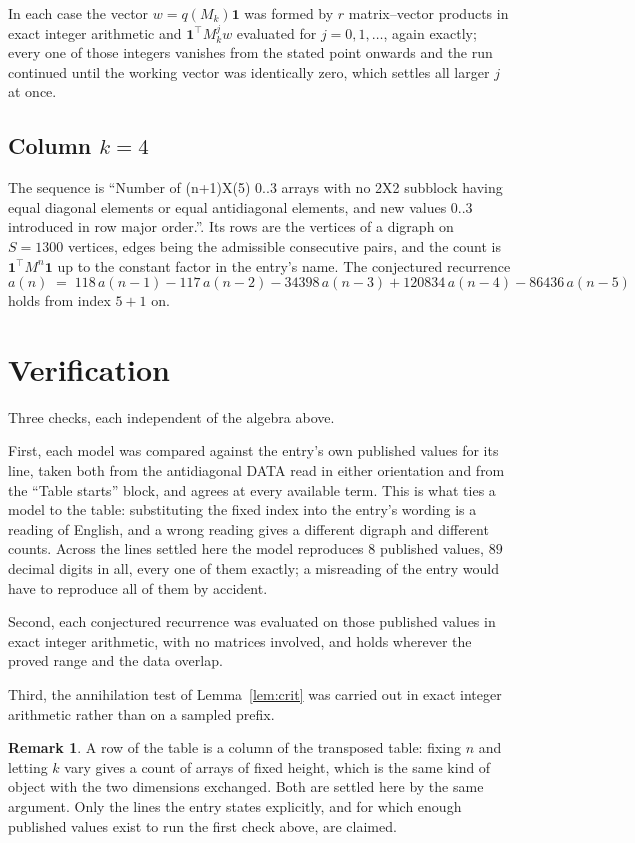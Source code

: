 \documentclass[11pt,a4paper]{article}
\theoremstyle{plain}
\theoremstyle{definition}
\newtheorem{remark}[theorem]{Remark}
\begin{document}
In each case the vector $w=q(M_k)\mathbf{1}$ was formed by $r$ matrix--vector products in
exact integer arithmetic and $\mathbf{1}^{\!\top}M_k^{j}w$ evaluated for $j=0,1,\dots$,
again exactly; every one of those integers vanishes from the stated point onwards and the run
continued until the working vector was identically zero, which settles all larger $j$ at once.

\subsection*{Column $k$$=4$}
The sequence is ``Number of (n+1)X(5) 0..3 arrays with no 2X2 subblock having equal diagonal elements or equal antidiagonal elements, and new values 0..3 introduced in row major order.''. Its rows are the vertices of a digraph on
$S=1300$ vertices, edges being the admissible consecutive pairs, and the count is
$\mathbf{1}^{\!\top}M^{n}\mathbf{1}$ up to the constant factor in the entry's name.
The conjectured recurrence
\[
a(n)\;=\;118\,a(n-1) - 117\,a(n-2) - 34398\,a(n-3) + 120834\,a(n-4) - 86436\,a(n-5)
\]
holds from index $5+1$ on.

\section{Verification}

Three checks, each independent of the algebra above.

First, each model was compared against the entry's own published values for its line, taken
both from the antidiagonal DATA read in either orientation and from the ``Table starts''
block, and agrees at every available term. This is what ties a model to the table:
substituting the fixed index into the entry's wording is a reading of English, and a wrong
reading gives a different digraph and different counts. Across the lines settled here the
model reproduces $8$ published values, $89$ decimal digits in all, every one of
them exactly; a misreading of the entry would have to reproduce all of them by accident.

Second, each conjectured recurrence was evaluated on those published values in exact
integer arithmetic, with no matrices involved, and holds wherever the proved range and the
data overlap.

Third, the annihilation test of Lemma~\ref{lem:crit} was carried out in exact integer
arithmetic rather than on a sampled prefix.

\begin{remark}
A row of the table is a column of the transposed table: fixing $n$ and letting $k$ vary gives a
count of arrays of fixed height, which is the same kind of object with the two dimensions
exchanged. Both are settled here by the same argument. Only the lines the entry states
explicitly, and for which enough published values exist to run the first check above, are
claimed.
\end{remark}
\end{document}
